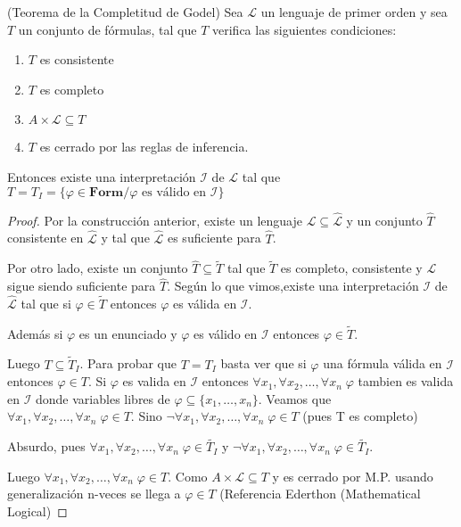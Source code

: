 \begin{colorario}
(Teorema de la Completitud de Godel) Sea $\mathcal{L}$ un lenguaje de primer orden y sea $T$ un conjunto de f\'ormulas, tal que $T$ verifica las siguientes condiciones:
 
\begin{enumerate}
	\item $T$ es consistente
	\item $T$ es completo
	\item $A \times \mathcal{L} \subseteq T$
	\item $T$ es cerrado por las reglas de inferencia.
\end{enumerate}
 
Entonces existe una interpretaci\'on $\mathcal{I}$ de $\mathcal{L}$ tal que $T = T_{I} = \{ \varphi \in \textbf{Form} / \varphi \text{ es v\'alido en } \mathcal{I} \}$
\end{colorario}
 
\begin{proof}
Por la construcci\'on anterior, existe un lenguaje $\mathcal{L} \subseteq \hat{\mathcal{L}}$ y un conjunto $\hat{T}$ consistente en $\hat{\mathcal{L}}$ y tal que $\hat{\mathcal{L}}$ es suficiente para $\hat{T}$. 
 
Por otro lado, existe un conjunto $\hat{T} \subseteq \widetilde{T}$ tal que $\widetilde{T}$ es completo, consistente y $\mathcal{L}$ sigue siendo suficiente para $\hat{T}$. Seg\'un lo que vimos,existe una interpretaci\'on $\mathcal{I}$ de $\hat{\mathcal{L}}$ tal que si $\varphi \in \widetilde{T}$ entonces $\varphi$ es v\'alida en $\mathcal{I}$.
 
Adem\'as si $\varphi$ es un enunciado y $\varphi$ es v\'alido en $\mathcal{I}$ entonces $\varphi \in \widetilde{T}$.
 
Luego $T \subseteq \widetilde{T}_{I}$. Para probar que $T = T_{I}$ basta ver que si $\varphi$ una f\'ormula v\'alida en $\mathcal{I}$ entonces $\varphi \in T$. Si $\varphi$ es valida en $\mathcal{I}$ entonces $\forall x_1, \forall x_2, \ldots, \forall x_n \; \varphi$ tambien es valida en $\mathcal{I}$ donde variables libres de $\varphi \subseteq \{x_1, \ldots, x_n \}$. Veamos que $\forall x_1, \forall x_2, \ldots, \forall x_n \; \varphi \in T$. Sino $\neg \forall x_1, \forall x_2, \ldots, \forall x_n \; \varphi \in T$ (pues T es completo)
 
Absurdo, pues $\forall x_1, \forall x_2, \ldots, \forall x_n \; \varphi \in \widetilde{T_{I}}$ y $\neg \forall x_1, \forall x_2, \ldots, \forall x_n \; \varphi \in \widetilde{T_{I}}$.
 
Luego $\forall x_1, \forall x_2, \ldots, \forall x_n \; \varphi \in T$. Como $A \times \mathcal{L} \subseteq T$ y es cerrado por M.P. usando generalizaci\'on n-veces se llega a $\varphi \in T$ (Referencia Ederthon (Mathematical Logical) 
\end{proof}
 
